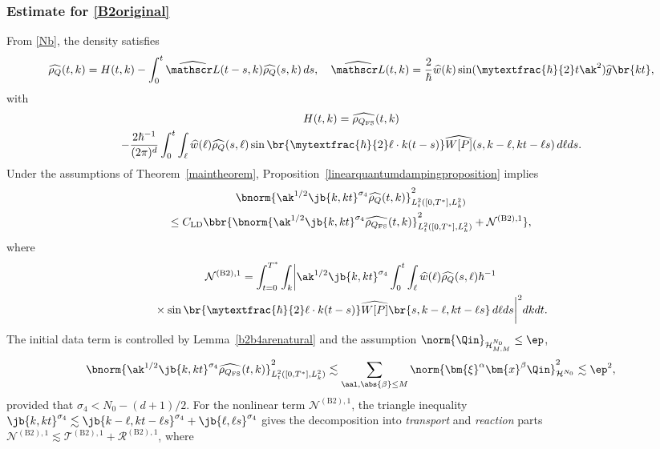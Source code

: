 \subsubsection{Estimate for \eqref{B2original}}\label{3.2.1}
From \eqref{Nb}, the density satisfies\vspace*{-3pt}
\begin{align*}
\widehat{\rho_Q}(t,k)=H(t,k)-\int_0^t \widehat{\mathscr L}(t-s,k)\widehat{\rho_Q}(s,k)\,ds,\quad \widehat{\mathscr L}(t,k)=\frac{2}{\hbar}\widehat w(k)\sin(\mytextfrac{\hbar}{2} t\ak^2)\widehat g\br{kt},
\end{align*}
with\vspace*{-3pt}
\begin{multline*}
H(t,k)=\widehat{\rho_{{Q_{\mathrm{FS}}}}}(t,k)\\
-\frac{2\hbar^{-1}}{(2\pi)^d}\int_0^t\int_\ell\widehat w(\ell)\widehat{\rho_Q}(s,\ell) \sin\br{\mytextfrac{\hbar}{2}\ell\cdot k(t-s)}\widehat{W[P]}(s,k-\ell,kt-\ell s)\,d\ell ds.
\end{multline*} Under the assumptions of Theorem~\ref{maintheorem}, Proposition~\ref{linearquantumdampingproposition} implies\vspace*{-3pt}
\begin{multline*}
\bnorm{\ak^{1/2}\jb{k,kt}^{\sigma_4}\widehat{\rho_Q}(t,k)}_{L^2_{t}([0,T^*],L^2_k)}^2\\
\leq C_{\mathrm{LD}}\bbr{\bnorm{\ak^{1/2}\jb{k,kt}^{\sigma_4}\widehat{\rho_{{Q_{\mathrm{FS}}}}}(t,k)}_{L^2_{t}([0,T^*],L^2_k)}^2+\mathcal {N}^{\mathrm{(B2),1}}},
\end{multline*}
where\vspace*{-3pt}
\begin{multline*}
\mathcal {N}^{\mathrm{(B2),1}}=\int_{t=0}^{T^*}\int_k\biggl|\ak^{1/2}\jb{k,kt}^{\sigma_4}\int_0^t\int_\ell\widehat w(\ell)\widehat{\rho_Q}(s,\ell) \hbar^{-1}\\
{}\times\sin\br{\mytextfrac{\hbar}{2}\ell\cdot k(t-s)}\widehat {W[P]}\br{s,k-\ell,kt-\ell s}\,d\ell ds\biggr|^2dkdt.
\end{multline*}
The initial data term is controlled by Lemma~\ref{b2b4arenatural} and the assumption $\norm{\Qin}_{\mathcal H^{N_0}_{M,M}}\leq\ep$,\vspace*{-3pt}
\begin{align*}
\bnorm{\ak^{1/2}\jb{k,kt}^{\sigma_4}\widehat{\rho_{{Q_{\mathrm{FS}}}}}(t,k)}_{L^2_{t}([0,T^*],L^2_k)}^2\lesssim\sum_{\aal,\abs{\beta}\leq M}\norm{\bm{\xi}^\alpha\bm{x}^\beta \Qin}_{\mathcal H^{N_0}}^2\lesssim\ep^2,
\end{align*}provided that $\sigma_4<N_0-(d+1)/2$. For the nonlinear term $\mathcal {N}^{\mathrm{(B2),1}}$, the triangle inequality $\jb{k,kt}^{\sigma_4}\lesssim \jb{k-\ell,kt-\ell s}^{\sigma_4}+\jb{\ell,\ell s}^{\sigma_4}$ gives the decomposition into \textit{transport} and \textit{reaction} parts $\mathcal{N}^{\mathrm{(B2),1}}\lesssim \mathcal{T}^{\mathrm{(B2),1}}+\mathcal{R}^{\mathrm{(B2),1}}$, where
